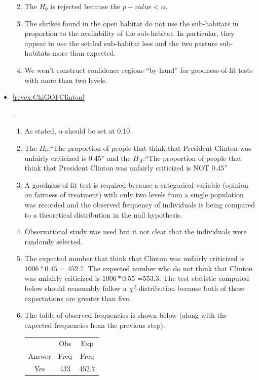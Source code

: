 \documentclass[10pt,openany]{book}\usepackage[]{graphicx}\usepackage[]{color}
\newenvironment{knitrout}{}{} %
\begin{document}
\begin{itemize}
\begin{enumerate}
\begin{knitrout}
\end{knitrout}
      \item The $H_{0}$ is rejected because the $p-value<\alpha$.
      \item The shrikes found in the open habitat do not use the sub-habitats in proportion to the availability of the sub-habitat.  In particular, they appear to use the settled sub-habitat less and the two pasture sub-habitats more than expected.
      \item We won't construct confidence regions ``by hand'' for goodness-of-fit tests with more than two levels.
    \end{enumerate}
  \item \hypertarget{ans:ChiGOFClinton}{\ref{revex:ChiGOFClinton}} --
    \begin{enumerate}
      \item As stated, $\alpha$ should be set at 0.10.
      \item The $H_{0}$:``The proportion of people that think that President Clinton was unfairly criticized is 0.45'' and the $H_{A}$:``The proportion of people that think that President Clinton was unfairly criticized is NOT 0.45''      \item A goodness-of-fit test is required because a categorical variable (opinion on fairness of treatment) with only two levels from a single population was recorded and the observed frequency of individuals is being compared to a theoretical distribution in the null hypothesis.
      \item Observational study was used but it not clear that the individuals were randomly selected.
      \item The expected number that think that Clinton was unfairly criticized is $1006*0.45$ = $452.7$.  The expected number who do not think that Clinton was unfairly criticized is $1006*0.55$ =$ 553.3$.  The test statistic computed below should reasonably follow a $\chi^{2}$-distribution because both of these expectations are greater than five.
      \item The table of observed frequencies is shown below (along with the expected frequencies from the previous step).
        \begin{center}
          \begin{tabular}{ccc}
            \hline\hline
            & Obs & Exp \\
            Answer & Freq & Freq \\
            \hline
            Yes & 433 & 452.7 \\

\end{tabular}
\end{center}
\end{enumerate}
\end{itemize}
\end{document}
